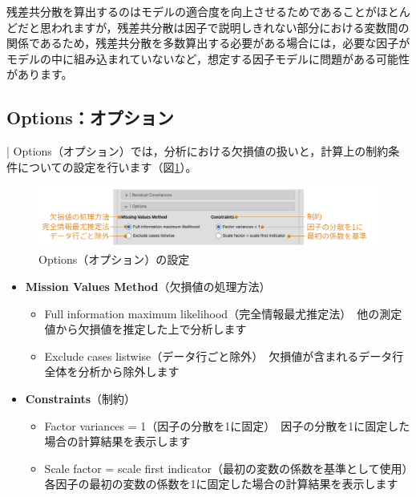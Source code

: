 \documentclass[
  12pt,
  a5jpaper,
  lualatex, ja=standard]{bxjsbook}
\providecommand{\tightlist}{%
  \setlength{\itemsep}{0pt}\setlength{\parskip}{0pt}}
\newenvironment{jmvsettings}{%
	\begin{center}%
	\begin{tcolorbox}[%
		title=設定項目,
		colframe=gmoji,
		colbacktitle=gmoji,
		colback=gmoji!2!white,
		breakable,
		width=.9\textwidth,
		]\small\addtolength{\leftmargini}{-3\labelsep}%
	}%
	{\end{tcolorbox}\end{center}}
\begin{document}
残差共分散を算出するのはモデルの適合度を向上させるためであることがほとんどだと思われますが，残差共分散は因子で説明しきれない部分における変数間の関係であるため，残差共分散を多数算出する必要がある場合には，必要な因子がモデルの中に組み込まれていないなど，想定する因子モデルに問題がある可能性があります。

\hypertarget{sub:factor-cfa-options}{%
\subsection{Options：オプション}\label{sub:factor-cfa-options}}

\colorbox{bar}{\textcolor{gmoji2}{| Options}}（オプション）では，分析における欠損値の扱いと，計算上の制約条件についての設定を行います（図\ref{fig:factor-cfa-option}）。

\begin{figure}[!ht]

{\centering \includegraphics[width=1\linewidth]{images/factor/cfa-option} 

}

\caption{Options（オプション）の設定}\label{fig:factor-cfa-option}
\end{figure}

\begin{jmvsettings}

\begin{itemize}
\tightlist
\item
  \textbf{Mission Values Method}（欠損値の処理方法）

  \begin{itemize}
  \tightlist
  \item
    Full information maximum likelihood（完全情報最尤推定法）　他の測定値から欠損値を推定した上で分析します
  \item
    Exclude cases listwise（データ行ごと除外）　欠損値が含まれるデータ行全体を分析から除外します
  \end{itemize}
\item
  \textbf{Constraints}（制約）

  \begin{itemize}
  \tightlist
  \item
    Factor variances = 1（因子の分散を1に固定）　因子の分散を1に固定した場合の計算結果を表示します
  \item
    Scale factor = scale first indicator（最初の変数の係数を基準として使用）　各因子の最初の変数の係数を1に固定した場合の計算結果を表示します
  \end{itemize}
\end{itemize}

\end{jmvsettings}
\end{document}
